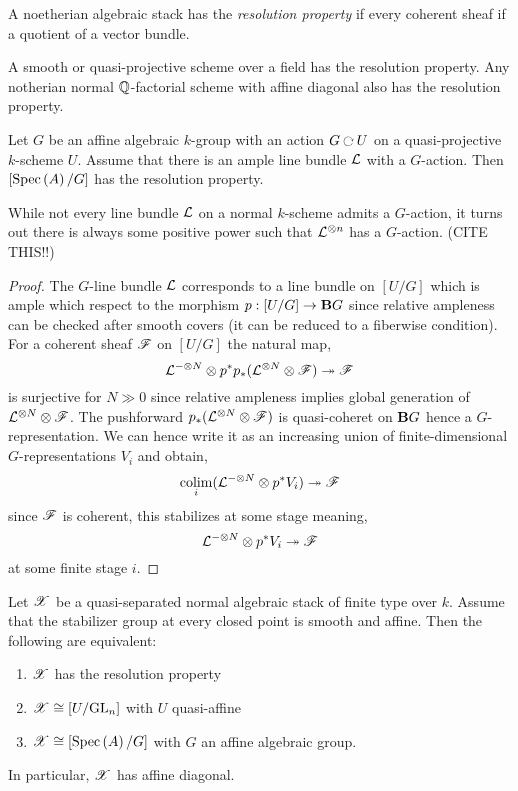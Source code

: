 \documentclass[12pt]{article}
\begin{document}
\begin{defn}
A noetherian algebraic stack has the \textit{resolution property} if every coherent sheaf if a quotient of a vector bundle.
\end{defn}

A smooth or quasi-projective scheme over a field has the resolution property. Any notherian normal $\mathbb{Q}$-factorial scheme with affine diagonal also has the resolution property.

\begin{prop}
Let $G$ be an affine algebraic $k$-group with an action $G \acts U$ on a quasi-projective $k$-scheme $U$. Assume that there is an ample line bundle $\mathcal{L}$ with a $G$-action. Then $[\mathrm{Spec}\left( A \right)/G]$ has the resolution property.
\end{prop}

\begin{rmk}
While not every line bundle $\mathcal{L}$ on a normal $k$-scheme admits a $G$-action, it turns out there is always some positive power such that $\mathcal{L}^{\otimes n}$ has a $G$-action. {\color{red} (CITE THIS!!)} 
\end{rmk}

\begin{proof}
The $G$-line bundle $\mathcal{L}$ corresponds to a line bundle on $[U/G]$ which is ample which respect to the morphism $p : [U/G] \to \mathbf{B} G$ since relative ampleness can be checked after smooth covers (it can be reduced to a fiberwise condition). For a coherent sheaf $\mathscr{F}$ on $[U/G]$ the natural map,
\[ \mathcal{L}^{-\otimes N} \otimes p^* p_* (\mathcal{L}^{\otimes N} \otimes \mathscr{F}) \twoheadrightarrow \mathscr{F} \]
is surjective for $N \gg 0$ since relative ampleness implies global generation of $\mathcal{L}^{\otimes N} \otimes \mathscr{F}$. The pushforward $p_* (\mathcal{L}^{\otimes N} \otimes \mathscr{F})$ is quasi-coheret on $\mathbf{B} G$ hence a $G$-representation. We can hence write it as an increasing union of finite-dimensional $G$-representations $V_i$ and obtain,
\[ \operatorname*{\mathrm{colim}}_i (\mathcal{L}^{-\otimes N} \otimes p^* V_i) \twoheadrightarrow \mathscr{F} \]
since $\mathscr{F}$ is coherent, this stabilizes at some stage meaning,
\[ \mathcal{L}^{-\otimes N} \otimes p^* V_i \twoheadrightarrow \mathscr{F} \]
at some finite stage $i$.
\end{proof}

\begin{theorem}
Let $\mathscr{X}$ be a quasi-separated normal algebraic stack of finite type over $k$. Assume that the stabilizer group at every closed point is smooth and affine. Then the following are equivalent:
\begin{enumerate}
\item $\mathscr{X}$ has the resolution property
\item $\mathscr{X} \cong [U / \mathrm{GL}_n]$ with $U$ quasi-affine
\item $\mathscr{X} \cong [\mathrm{Spec}\left( A \right) / G]$ with $G$ an affine algebraic group.
\end{enumerate}
In particular, $\mathscr{X}$ has affine diagonal.
\end{theorem}
\end{document}
